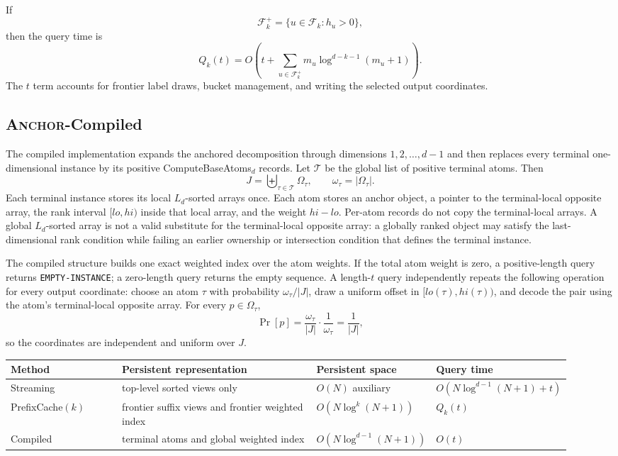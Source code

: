 \documentclass[11pt]{article}
\DeclareRobustCommand{\ANCHOR}{\textnormal{\textsc{Anchor}}}
\newcommand{\code}[1]{\texttt{#1}}
\theoremstyle{definition}
\begin{document}
If
\[
  \mathcal F_k^+=\{u\in\mathcal F_k:h_u>0\},
\]
then the query time is
\[
  Q_k(t)=
  O\left(
    t+
    \sum_{u\in\mathcal F_k^+}
      m_u\log^{d-k-1}(m_u+1)
  \right).
\]
The $t$ term accounts for frontier label draws, bucket management, and writing the selected output coordinates.

\subsection{\texorpdfstring{\ANCHOR-Compiled}{ANCHOR-Compiled}}

The compiled implementation expands the anchored decomposition through dimensions $1,2,\ldots,d-1$ and then replaces every terminal one-dimensional instance by its positive ComputeBaseAtoms$_d$ records.  Let $\mathcal T$ be the global list of positive terminal atoms.  Then
\[
  J=\biguplus_{\tau\in\mathcal T}\Omega_\tau,
  \qquad
  \omega_\tau=|\Omega_\tau|.
\]
Each terminal instance stores its local $L_d$-sorted arrays once.  Each atom stores an anchor object, a pointer to the terminal-local opposite array, the rank interval $[lo,hi)$ inside that local array, and the weight $hi-lo$.  Per-atom records do not copy the terminal-local arrays.  A global $L_d$-sorted array is not a valid substitute for the terminal-local opposite array: a globally ranked object may satisfy the last-dimensional rank condition while failing an earlier ownership or intersection condition that defines the terminal instance.

The compiled structure builds one exact weighted index over the atom weights.  If the total atom weight is zero, a positive-length query returns \code{EMPTY-INSTANCE}; a zero-length query returns the empty sequence.  A length-$t$ query independently repeats the following operation for every output coordinate: choose an atom $\tau$ with probability $\omega_\tau/|J|$, draw a uniform offset in $[lo(\tau),hi(\tau))$, and decode the pair using the atom's terminal-local opposite array.  For every $p\in\Omega_\tau$,
\[
  \Pr[p]=\frac{\omega_\tau}{|J|}\cdot\frac{1}{\omega_\tau}=\frac{1}{|J|},
\]
so the coordinates are independent and uniform over $J$.

\begin{center}
\small
\begin{tabular}{@{}>{\raggedright\arraybackslash}p{0.20\linewidth}>{\raggedright\arraybackslash}p{0.35\linewidth}>{\raggedright\arraybackslash}p{0.20\linewidth}>{\raggedright\arraybackslash}p{0.17\linewidth}@{}}
\toprule
Method & Persistent representation & Persistent space & Query time \\
\midrule
Streaming & top-level sorted views only & $O(N)$ auxiliary & $O(N\log^{d-1}(N+1)+t)$ \\
PrefixCache$(k)$ & frontier suffix views and frontier weighted index & $O(N\log^k(N+1))$ & $Q_k(t)$ \\
Compiled & terminal atoms and global weighted index & $O(N\log^{d-1}(N+1))$ & $O(t)$ \\
\bottomrule
\end{tabular}
\end{center}
\end{document}
